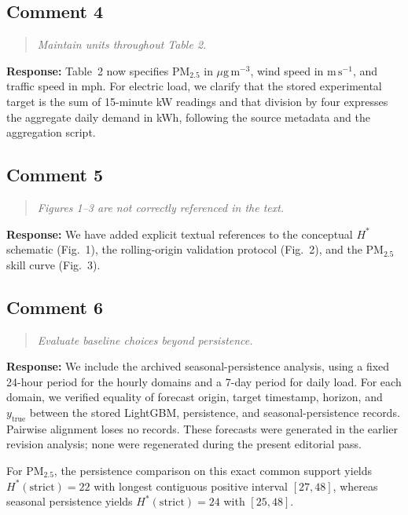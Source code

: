 \documentclass[11pt,a4paper]{article}
\let\originalsubsection\subsection
\renewcommand{\subsection}{\Needspace{9\baselineskip}\originalsubsection}
\newenvironment{reviewcomment}
  {\begin{quote}\itshape}
  {\end{quote}}
\newcommand{\response}{\noindent\textbf{Response:} }
\begin{document}
\subsection*{Comment 4}

\begin{reviewcomment}
Maintain units throughout Table 2.
\end{reviewcomment}

\response
Table~2 now specifies PM$_{2.5}$ in $\mu\mathrm{g\,m^{-3}}$, wind speed in
$\mathrm{m\,s^{-1}}$, and traffic speed in mph. For electric load, we clarify that the
stored experimental target is the sum of 15-minute kW readings and that
division by four expresses the aggregate daily demand in kWh, following the source
metadata and the aggregation script.


\subsection*{Comment 5}

\begin{reviewcomment}
Figures 1--3 are not correctly referenced in the text.
\end{reviewcomment}

\response
We have added explicit textual references to the conceptual $H^*$ schematic
(Fig.~1), the rolling-origin validation protocol (Fig.~2), and the
PM$_{2.5}$ skill curve (Fig.~3).


\subsection*{Comment 6}

\begin{reviewcomment}
Evaluate baseline choices beyond persistence.
\end{reviewcomment}

\response
We include the archived seasonal-persistence analysis, using a fixed
24-hour period for the hourly domains and a 7-day period for daily load.
For each domain, we verified equality of forecast origin, target timestamp,
horizon, and $y_{\mathrm{true}}$ between the stored LightGBM, persistence,
and seasonal-persistence records. Pairwise alignment loses no records.
These forecasts were generated in the earlier revision analysis; none
were regenerated during the present editorial pass.

For PM$_{2.5}$, the persistence comparison on this exact common support yields
$H^*(\mathrm{strict})=22$ with longest contiguous positive interval $[27,48]$,
whereas seasonal persistence yields $H^*(\mathrm{strict})=24$ with $[25,48]$.
\end{document}
